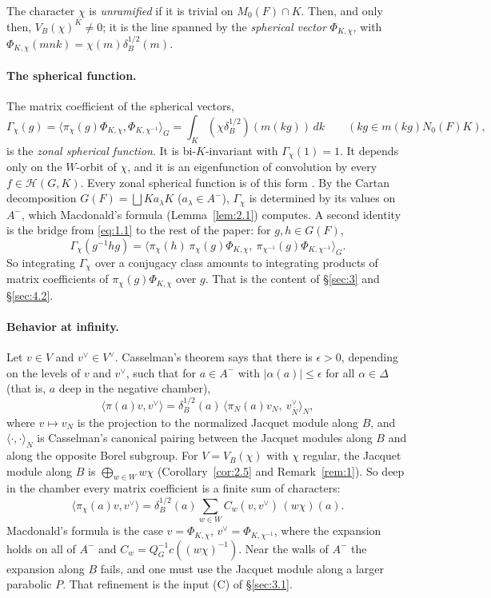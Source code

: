 \documentclass[12pt,letterpaper]{article}
\numberwithin{equation}{section}
\theoremstyle{plain}
\theoremstyle{remark}
\theoremstyle{plain}
\theoremstyle{definition}
\theoremstyle{remark}
\theoremstyle{remark}
\newcommand{\Hc}{\mathcal{H}}
\newcommand{\ip}[1]{\langle #1\rangle}
\begin{document}
The character $\chi$ is \emph{unramified} if it is trivial on $M_0(F)\cap K$. Then, and only then, $V_B(\chi)^K\ne0$; it is the line spanned by the \emph{spherical vector} $\Phi_{K,\chi}$, with $\Phi_{K,\chi}(mnk)=\chi(m)\delta_B^{1/2}(m)$.

\paragraph{The spherical function.} The matrix coefficient of the spherical vectors,
\[
\Gamma_\chi(g)=\ip{\pi_\chi(g)\Phi_{K,\chi},\Phi_{K,\chi^{-1}}}_G=\int_K(\chi\delta_B^{1/2})(m(kg))\,dk\qquad(kg\in m(kg)N_0(F)K),
\]
is the \emph{zonal spherical function}. It is bi-$K$-invariant with $\Gamma_\chi(1)=1$. It depends only on the $W$-orbit of $\chi$, and it is an eigenfunction of convolution by every $f\in\Hc(G,K)$. Every zonal spherical function is of this form \cite[Thm.~3.3.12]{Ma71}. By the Cartan decomposition $G(F)=\bigsqcup Ka_\lambda K$ ($a_\lambda\in A^-$), $\Gamma_\chi$ is determined by its values on $A^-$, which Macdonald's formula (Lemma~\ref{lem:2.1}) computes. A second identity is the bridge from \eqref{eq:1.1} to the rest of the paper: for $g,h\in G(F)$,
\[
\Gamma_\chi(g^{-1}hg)=\ip{\pi_\chi(h)\,\pi_\chi(g)\Phi_{K,\chi},\ \pi_{\chi^{-1}}(g)\Phi_{K,\chi^{-1}}}_G.
\]
So integrating $\Gamma_\chi$ over a conjugacy class amounts to integrating products of matrix coefficients of $\pi_\chi(g)\Phi_{K,\chi}$ over $g$. That is the content of \S\ref{sec:3} and \S\ref{sec:4.2}.

\paragraph{Behavior at infinity.} Let $v\in V$ and $v^\vee\in V^\vee$. Casselman's theorem \cite[\S4]{Ca95} says that there is $\epsilon>0$, depending on the levels of $v$ and $v^\vee$, such that for $a\in A^-$ with $|\alpha(a)|\le\epsilon$ for all $\alpha\in\Delta$ (that is, $a$ deep in the negative chamber),
\[
\ip{\pi(a)v,v^\vee}=\delta_B^{1/2}(a)\,\ip{\pi_N(a)v_N,\ v^\vee_{\bar N}}_N,
\]
where $v\mapsto v_N$ is the projection to the normalized Jacquet module along $B$, and $\ip{\cdot,\cdot}_N$ is Casselman's canonical pairing between the Jacquet modules along $B$ and along the opposite Borel subgroup. For $V=V_B(\chi)$ with $\chi$ regular, the Jacquet module along $B$ is $\bigoplus_{w\in W}w\chi$ (Corollary~\ref{cor:2.5} and Remark~\ref{rem:1}). So deep in the chamber every matrix coefficient is a finite sum of characters:
\[
\ip{\pi_\chi(a)v,v^\vee}=\delta_B^{1/2}(a)\sum_{w\in W}C_w(v,v^\vee)\,(w\chi)(a).
\]
Macdonald's formula is the case $v=\Phi_{K,\chi}$, $v^\vee=\Phi_{K,\chi^{-1}}$, where the expansion holds on all of $A^-$ and $C_w=Q_G^{-1}c((w\chi)^{-1})$. Near the walls of $A^-$ the expansion along $B$ fails, and one must use the Jacquet module along a larger parabolic $P$. That refinement is the input (C) of \S\ref{sec:3.1}.
\end{document}
